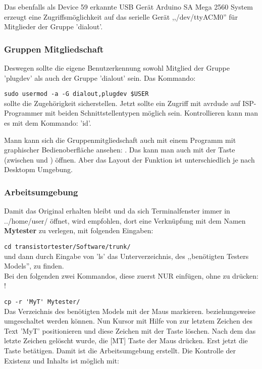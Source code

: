 Das ebenfalls als Device 59 erkannte USB Gerät  Arduino SA Mega 2560 System erzeugt eine
Zugriffsmöglichkeit auf das serielle Gerät ,,/dev/ttyACM0'' für Mitglieder der Gruppe 'dialout'.

\subsubsection{Gruppen Mitgliedschaft}

Deswegen sollte die eigene Benutzerkennung sowohl Mitglied der Gruppe 'plugdev' als auch
der Gruppe 'dialout' sein. Das Kommando:

\verb"sudo usermod -a -G dialout,plugdev $USER"\\
sollte die Zugehörigkeit sicherstellen. 
Jetzt sollte ein Zugriff mit avrdude auf ISP-Programmer mit beiden Schnittstellentypen möglich sein.
Kontrollieren kann man es mit dem Kommando: 'id'. 

Mann kann sich die Gruppenmitgliedschaft auch mit einem Programm mit graphischer Bedienoberfläche ansehen:
.
Das  kann man auch mit der \keys{\winmenu} Taste (zwischen  und
\keys{\Alt}) öffnen.
Aber das Layout der Funktion ist unterschiedlich je nach Desktopm Umgebung.

\subsubsection{Arbeitsumgebung}

Damit das Original erhalten bleibt und da sich Terminalfenster immer in ../home/\glqq user\grqq/ öffnet, wird empfohlen, dort eine Verknüpfung mit dem Namen \textbf {Mytester} zu verlegen, mit folgenden Eingaben:

\verb"cd transistortester/Software/trunk/"\\
und dann durch Eingabe von 'ls' das Unterverzeichnis, des ,,benötigten Testers Models'', zu finden.\\
Bei den folgenden zwei Kommandos, diese zuerst NUR einfügen, ohne  zu drücken: !

\verb"cp -r 'MyT' Mytester/"\\
Das Verzeichnis des benötigten Models mit der Maus markieren.
beziehungsweise  umgeschaltet werden können.
Nun Kursor mit Hilfe von \keys{\arrowkeyleft} zur letztem Zeichen des Text 'MyT' positionieren und
diese Zeichen mit der \keys{\backspace} Taste löschen.
Nach dem das letzte Zeichen gelöscht wurde, die [MT] Taste der Maus drücken.
Erst jetzt die \keys{\enter} Taste betätigen.
Damit ist die Arbeitsumgebung erstellt.
Die Kontrolle der Existenz und Inhalts ist möglich mit:\\

